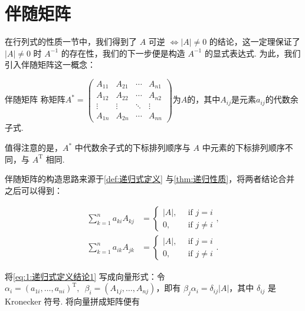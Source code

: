 \section{伴随矩阵}

在行列式的性质一节中，我们得到了 $A$ 可逆 $\iff |A| \neq 0$ 的结论，这一定理保证了 $|A| \neq 0$ 时 $A^{-1}$ 的存在性，我们的下一步便是构造 $A^{-1}$ 的显式表达式. 为此，我们引入伴随矩阵这一概念：

\begin{definition}{伴随矩阵}{}
    称矩阵$A^*=\begin{pmatrix}
            A_{11} & A_{21} & \cdots & A_{n1} \\
            A_{12} & A_{22} & \cdots & A_{n2} \\
            \vdots & \vdots & \ddots & \vdots \\
            A_{1n} & A_{2n} & \cdots & A_{nn}
        \end{pmatrix}$为$A$的，其中$A_{ij}$是元素$a_{ij}$的代数余子式.
\end{definition}

值得注意的是，$A^*$ 中代数余子式的下标排列顺序与 $A$ 中元素的下标排列顺序不同，与 $A^{\mathrm{T}}$ 相同.

伴随矩阵的构造思路来源于\autoref{def:递归式定义} 与\autoref{thm:递归性质}，将两者结论合并之后可以得到：

\begin{align}
    \label{eq:1:递归式定义结论1}
    \sum\limits_{k=1}^{n} a_{ki} A_{kj} &= \begin{cases}
        |A|, \enspace &\text{if } j = i \\
        0, \enspace &\text{if } j \neq i
    \end{cases}, \\
    \label{eq:1:递归式定义结论2}
    \sum\limits_{k=1}^{n} a_{ik} A_{jk} &= \begin{cases}
        |A|, \enspace &\text{if } j = i \\
        0, \enspace &\text{if } j \neq i
    \end{cases}.
\end{align}

将\autoref{eq:1:递归式定义结论1} 写成向量形式：令 $\alpha_i = (a_{1i},\ldots,a_{ni})^{\mathrm{T}}, \enspace \beta_i = (A_{1j}, \ldots, A_{nj})$，即有 $\beta_j \alpha_i = \delta_{ij}|A|$，其中 $\delta_{ij}$ 是 Kronecker 符号. 将向量拼成矩阵便有

